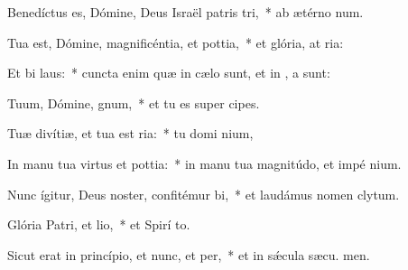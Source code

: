 \item Benedíctus es, Dómine, Deus Israël patris tri,~* ab ætérno  num.
\item Tua est, Dómine, magnificéntia, et pottia,~* et glória, at ria:
\item Et bi laus:~* cuncta enim quæ in cælo sunt, et in , a sunt:
\item Tuum, Dómine, gnum,~* et tu es super  cipes.
\item Tuæ divítiæ, et tua est ria:~* tu domi nium,
\item In manu tua virtus et pottia:~* in manu tua magnitúdo, et impé nium.
\item Nunc ígitur, Deus noster, confitémur bi,~* et laudámus nomen  clytum.
\item Glória Patri, et lio,~* et Spirí to.
\item Sicut erat in princípio, et nunc, et per,~* et in sǽcula sæcu. men.
